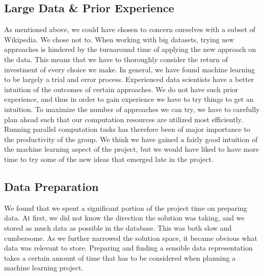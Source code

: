 \subsection{Large Data \& Prior Experience}
As mentioned above, we could have chosen to concern ourselves with a subset of Wikipedia. We chose not to. When working with big datasets, trying new approaches is hindered by the turnaround time of applying the new approach on the data. This means that we have to thoroughly consider the return of investment of every choice we make. In general, we have found machine learning to be largely a trial and error process. Experienced data scientists have a better intuition of the outcomes of certain approaches. We do not have such prior experience, and thus in order to gain experience we have to try things to get an intuition. To maximize the number of approaches we can try, we have to carefully plan ahead such that our computation resources are utilized most efficiently. Running parallel computation tasks has therefore been of major importance to the productivity of the group. We think we have gained a fairly good intuition of the machine learning aspect of the project, but we would have liked to have more time to try some of the new ideas that emerged late in the project. 

\subsection{Data Preparation}
We found that we spent a significant portion of the project time on preparing data. At first, we did not know the direction the solution was taking, and we stored as much data as possible in the database. This was both slow and cumbersome. As we further narrowed the solution space, it became obvious what data was relevant to store. Preparing and finding a sensible data representation takes a certain amount of time that has to be considered when planning a machine learning project.

